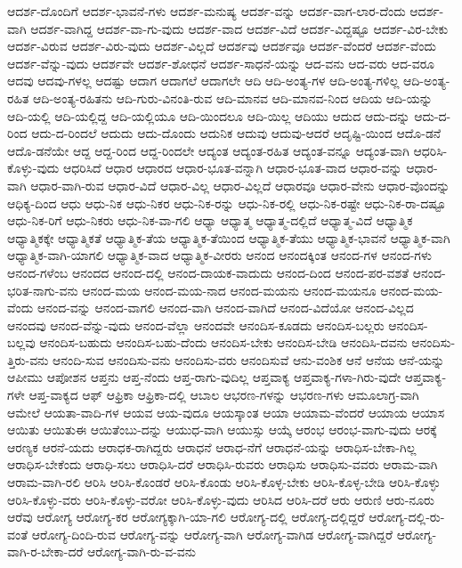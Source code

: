 {ಆದರ್ಶ-ದೊಂದಿಗೆ
ಆದರ್ಶ-ಭಾವನೆ-ಗಳು
ಆದರ್ಶ-ಮನುಷ್ಯ
ಆದರ್ಶ-ವನ್ನು
ಆದರ್ಶ-ವಾಗ-ಲಾರ-ದೆಂದು
ಆದರ್ಶ-ವಾಗಿ
ಆದರ್ಶ-ವಾಗಿದ್ದ
ಆದರ್ಶ-ವಾ-ಗು-ವುದು
ಆದರ್ಶ-ವಾದ
ಆದರ್ಶ-ವಿದೆ
ಆದರ್ಶ-ವಿದ್ದಷ್ಟೂ
ಆದರ್ಶ-ವಿರ-ಬೇಕು
ಆದರ್ಶ-ವಿರುವ
ಆದರ್ಶ-ವಿರು-ವುದು
ಆದರ್ಶ-ವಿಲ್ಲದೆ
ಆದರ್ಶವು
ಆದರ್ಶವೂ
ಆದರ್ಶ-ವೆಂದರೆ
ಆದರ್ಶ-ವೆಂದು
ಆದರ್ಶ-ವೆನ್ನು-ವುದು
ಆದರ್ಶವೇ
ಆದರ್ಶ-ಶೋಧನೆ
ಆದರ್ಶ-ಸಾಧನೆ-ಯನ್ನು
ಆದ-ವನು
ಆದ-ವರು
ಆದ-ವರೂ
ಆದವು
ಆದವು-ಗಳಲ್ಲ
ಆದಷ್ಟು
ಆದಾಗ
ಆದಾಗಲೆ
ಆದಾಗಲೇ
ಆದಿ
ಆದಿ-ಅಂತ್ಯ-ಗಳ
ಆದಿ-ಅಂತ್ಯ-ಗಳಿಲ್ಲ
ಆದಿ-ಅಂತ್ಯ-ರಹಿತ
ಆದಿ-ಅಂತ್ಯ-ರಹಿತನು
ಆದಿ-ಗುರು-ವಿನಂತಿ-ರುವ
ಆದಿ-ಮಾನವ
ಆದಿ-ಮಾನವ-ನಿಂದ
ಆದಿಯ
ಆದಿ-ಯನ್ನು
ಆದಿ-ಯಲ್ಲಿ
ಆದಿ-ಯಲ್ಲಿದ್ದ
ಆದಿ-ಯಲ್ಲಿಯೂ
ಆದಿ-ಯಿಂದಲೂ
ಆದಿ-ಯಿಲ್ಲ
ಆದಿಯು
ಆದುದ
ಆದು-ದನ್ನು
ಆದು-ದ-ರಿಂದ
ಆದು-ದ-ರಿಂದಲೆ
ಆದುದು
ಆದು-ದೊಂದು
ಆದುನಿಕ
ಆದುವು
ಆದುವು-ಆದರೆ
ಆದೃಷ್ಟಿ-ಯಿಂದ
ಆದೊ-ಡನೆ
ಆದೊ-ಡನೆಯೇ
ಆದ್ದ
ಆದ್ದ-ರಿಂದ
ಆದ್ದ-ರಿಂದಲೇ
ಆದ್ಯಂತ
ಆದ್ಯಂತ-ರಹಿತ
ಆದ್ಯಂತ-ವನ್ನೂ
ಆದ್ಯಂತ-ವಾಗಿ
ಆಧರಿಸಿ-ಕೊಳ್ಳು-ವುದು
ಆಧರಿಸಿದೆ
ಆಧಾರ
ಆಧಾರದ
ಆಧಾರ-ಭೂತ-ವನ್ನಾಗಿ
ಆಧಾರ-ಭೂತ-ವಾದ
ಆಧಾರ-ವನ್ನು
ಆಧಾರ-ವಾಗಿ
ಆಧಾರ-ವಾಗಿ-ರುವ
ಆಧಾರ-ವಿದೆ
ಆಧಾರ-ವಿಲ್ಲ
ಆಧಾರ-ವಿಲ್ಲದೆ
ಆಧಾರವೂ
ಆಧಾರ-ವೇನು
ಆಧಾರ-ವೊಂದನ್ನು
ಆಧಿಕ್ಯ-ದಿಂದ
ಆಧು
ಆಧು-ನಿಕ
ಆಧು-ನಿಕರ
ಆಧು-ನಿಕ-ರನ್ನು
ಆಧು-ನಿಕ-ರಲ್ಲಿ
ಆಧು-ನಿಕ-ರಷ್ಟೇ
ಆಧು-ನಿಕ-ರಾ-ದಷ್ಟೂ
ಆಧು-ನಿಕ-ರಿಗೆ
ಆಧು-ನಿಕರು
ಆಧು-ನಿಕ-ವಾ-ಗಲಿ
ಆಧ್ಯಾ
ಆಧ್ಯಾತ್ಮ
ಆಧ್ಯಾತ್ಮ-ದಲ್ಲಿದೆ
ಆಧ್ಯಾತ್ಮ-ವಿದೆ
ಆಧ್ಯಾತ್ಮಿಕ
ಆಧ್ಯಾತ್ಮಿಕಕ್ಕೇ
ಆಧ್ಯಾತ್ಮಿಕತೆ
ಆಧ್ಯಾತ್ಮಿಕ-ತೆಯ
ಆಧ್ಯಾತ್ಮಿಕ-ತೆಯಿಂದ
ಆಧ್ಯಾತ್ಮಿಕ-ತೆಯು
ಆಧ್ಯಾತ್ಮಿಕ-ಭಾವನೆ
ಆಧ್ಯಾತ್ಮಿಕ-ವಾಗಿ
ಆಧ್ಯಾತ್ಮಿಕ-ವಾಗಿ-ಯಾಗಲಿ
ಆಧ್ಯಾತ್ಮಿಕ-ವಾದ
ಆಧ್ಯಾತ್ಮಿಕ-ವೀರರು
ಆನಂದ
ಆನಂದಕ್ಕಿಂತ
ಆನಂದ-ಗಳ
ಆನಂದ-ಗಳು
ಆನಂದ-ಗಳೆಂಬ
ಆನಂದದ
ಆನಂದ-ದಲ್ಲಿ
ಆನಂದ-ದಾಯಕ-ವಾದುದು
ಆನಂದ-ದಿಂದ
ಆನಂದ-ಪರ-ವಶತೆ
ಆನಂದ-ಭರಿತ-ನಾಗು-ವನು
ಆನಂದ-ಮಯ
ಆನಂದ-ಮಯ-ನಾದ
ಆನಂದ-ಮಯನು
ಆನಂದ-ಮಯನೂ
ಆನಂದ-ಮಯ-ವೆಂದು
ಆನಂದ-ವನ್ನು
ಆನಂದ-ವಾಗಲಿ
ಆನಂದ-ವಾಗಿ
ಆನಂದ-ವಾಗಿದೆ
ಆನಂದ-ವಿದೆಯೋ
ಆನಂದ-ವಿಲ್ಲದ
ಆನಂದವು
ಆನಂದ-ವೆನ್ನು-ವುದು
ಆನಂದ-ವೆಲ್ಲಾ
ಆನಂದವೇ
ಆನಂದಿಸ-ಕೂಡದು
ಆನಂದಿಸ-ಬಲ್ಲರು
ಆನಂದಿಸ-ಬಲ್ಲವು
ಆನಂದಿಸ-ಬಹುದು
ಆನಂದಿಸ-ಬಹು-ದೆಂದು
ಆನಂದಿಸ-ಬೇಕು
ಆನಂದಿಸ-ಬೇಡಿ
ಆನಂದಿಸಿ-ದವನು
ಆನಂದಿಸು-ತ್ತಿರು-ವನು
ಆನಂದಿ-ಸುವ
ಆನಂದಿಸು-ವನು
ಆನಂದಿಸು-ವರು
ಆನಂದಿಸುವೆ
ಆನು-ವಂಶಿಕ
ಆನೆ
ಆನೆಯ
ಆನೆ-ಯನ್ನು
ಆಪೀಮು
ಆಪೋಶನ
ಆಪ್ತನು
ಆಪ್ತ-ನೆಂದು
ಆಪ್ತ-ರಾಗು-ವುದಿಲ್ಲ
ಆಪ್ತವಾಕ್ಯ
ಆಪ್ತವಾಕ್ಯ-ಗಳಾ-ಗಿರು-ವುದೇ
ಆಪ್ತವಾಕ್ಯ-ಗಳೇ
ಆಪ್ತ-ವಾಕ್ಯದ
ಆಫ್
ಆಫ್ರಿಕಾ
ಆಫ್ರಿಕಾ-ದಲ್ಲಿ
ಆಬಾಲ
ಆಭರಣ-ಗಳನ್ನು
ಆಭರಣ-ಗಳು
ಆಮೂಲಾಗ್ರ-ವಾಗಿ
ಆಮೇಲೆ
ಆಯತಾ-ವಾದಿ-ಗಳ
ಆಯವ
ಆಯ-ವುದೂ
ಆಯಸ್ಕಾಂತ
ಆಯಾ
ಆಯಾಮ-ವೆಂದರೆ
ಆಯಾಯ
ಆಯಾಸ
ಆಯಿತು
ಆಯಿತುಈ
ಆಯಿತೆಂಬು-ದನ್ನು
ಆಯುಧ-ವಾಗಿ
ಆಯುಸ್ಸು
ಆಯ್ಕೆ
ಆರಂಭ
ಆರಂಭ-ವಾಗು-ವುದು
ಆರಕ್ಕೆ
ಆರಣ್ಯಕ
ಆರನೆ-ಯದು
ಆರಾಧಕ-ರಾಗಿದ್ದರು
ಆರಾಧನೆ
ಆರಾಧ-ನೆಗೆ
ಆರಾಧನೆ-ಯನ್ನು
ಆರಾಧಿಸ-ಬೇಕಾ-ಗಿಲ್ಲ
ಆರಾಧಿಸ-ಬೇಕೆಂದು
ಆರಾಧಿ-ಸಲು
ಆರಾಧಿಸಿ-ದರೆ
ಆರಾಧಿಸಿ-ರುವರು
ಆರಾಧಿಸು
ಆರಾಧಿಸು-ವವರು
ಆರಾಮ-ವಾಗಿ
ಆರಾಮ-ವಾಗಿ-ರಲಿ
ಆರಿಸಿ
ಆರಿಸಿ-ಕೊಂಡರೆ
ಆರಿಸಿ-ಕೊಂಡು
ಆರಿಸಿ-ಕೊಳ್ಳ-ಬೇಕು
ಆರಿಸಿ-ಕೊಳ್ಳ-ಬೇಡಿ
ಆರಿಸಿ-ಕೊಳ್ಳು
ಆರಿಸಿ-ಕೊಳ್ಳು-ವರು
ಆರಿಸಿ-ಕೊಳ್ಳು-ವರೋ
ಆರಿಸಿ-ಕೊಳ್ಳು-ವುದು
ಆರಿಸಿದ
ಆರಿಸಿ-ದರೆ
ಆರು
ಆರುಣಿ
ಆರು-ನೂರು
ಆರೆವು
ಆರೋಗ್ಯ
ಆರೋಗ್ಯ-ಕರ
ಆರೋಗ್ಯಕ್ಕಾಗಿ-ಯಾ-ಗಲಿ
ಆರೋಗ್ಯ-ದಲ್ಲಿ
ಆರೋಗ್ಯ-ದಲ್ಲಿದ್ದರೆ
ಆರೋಗ್ಯ-ದಲ್ಲಿ-ರು-ವಂತೆ
ಆರೋಗ್ಯ-ದಿಂದಿ-ರುವ
ಆರೋಗ್ಯ-ವನ್ನು
ಆರೋಗ್ಯ-ವಾಗಿ
ಆರೋಗ್ಯ-ವಾಗಿಡ
ಆರೋಗ್ಯ-ವಾಗಿದ್ದರೆ
ಆರೋಗ್ಯ-ವಾಗಿ-ರ-ಬೇಕಾ-ದರೆ
ಆರೋಗ್ಯ-ವಾಗಿ-ರು-ವ-ವನು
}
